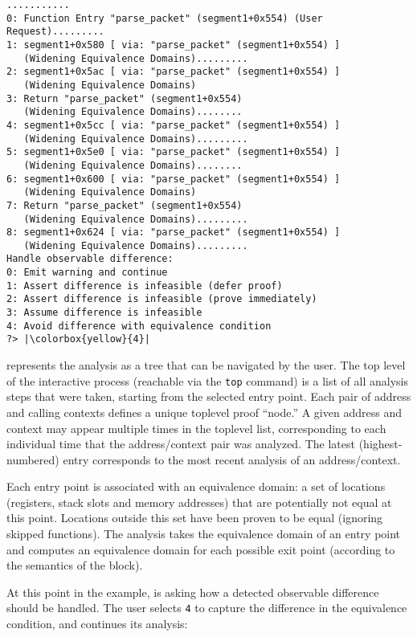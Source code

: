 \begin{lstlisting}
...........
0: Function Entry "parse_packet" (segment1+0x554) (User Request).........
1: segment1+0x580 [ via: "parse_packet" (segment1+0x554) ]
   (Widening Equivalence Domains).........
2: segment1+0x5ac [ via: "parse_packet" (segment1+0x554) ]
   (Widening Equivalence Domains)
3: Return "parse_packet" (segment1+0x554)
   (Widening Equivalence Domains)........
4: segment1+0x5cc [ via: "parse_packet" (segment1+0x554) ]
   (Widening Equivalence Domains).........
5: segment1+0x5e0 [ via: "parse_packet" (segment1+0x554) ]
   (Widening Equivalence Domains)........
6: segment1+0x600 [ via: "parse_packet" (segment1+0x554) ]
   (Widening Equivalence Domains)
7: Return "parse_packet" (segment1+0x554)
   (Widening Equivalence Domains).........
8: segment1+0x624 [ via: "parse_packet" (segment1+0x554) ]
   (Widening Equivalence Domains).........
Handle observable difference:
0: Emit warning and continue
1: Assert difference is infeasible (defer proof)
2: Assert difference is infeasible (prove immediately)
3: Assume difference is infeasible
4: Avoid difference with equivalence condition
?> |\colorbox{yellow}{4}|
\end{lstlisting}

\pate{} represents the analysis as a tree that can be navigated by the user.
The top level of the interactive process (reachable via the \texttt{top} command) is a list of all analysis steps that were taken, starting from the selected entry point.
Each pair of address and calling contexts defines a unique toplevel proof ``node.''
A given address and context may appear multiple times in the toplevel list, corresponding to each individual time that the address/context pair was analyzed.
The latest (highest-numbered) entry corresponds to the most recent analysis of an address/context.

Each entry point is associated with an equivalence domain: a set of locations (registers, stack slots and memory addresses) that are potentially not equal at this point.
Locations outside this set have been proven to be equal (ignoring skipped functions).
The analysis takes the equivalence domain of an entry point and computes an equivalence domain for each possible exit point (according to the semantics of the block).

At this point in the example, \pate{} is asking how a detected observable difference should be handled.
The user selects \texttt{4} to capture the difference in the equivalence condition, and \pate{} continues its analysis:


